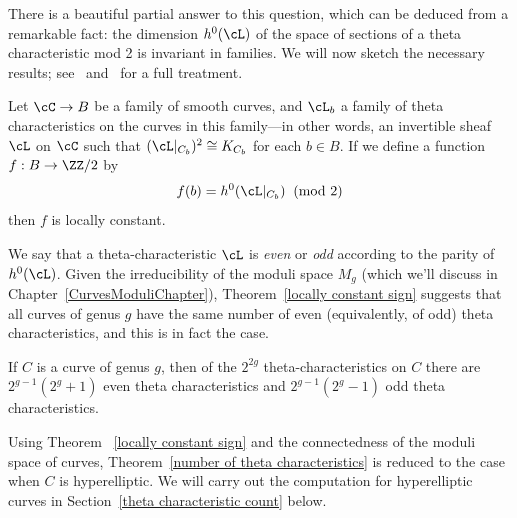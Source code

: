  There is a beautiful partial answer to this question, which can be deduced from a remarkable fact: the dimension $h^0(\cL)$ of the space of sections of a theta characteristic mod 2 is invariant in families.
We will now
sketch the necessary results; see~\cite{MumfordPaper} and~\cite{JHPaper} for a full treatment.

 \begin{theorem}\label{locally constant sign} Let $\cC \to B$ be a family of smooth curves, and $\cL_b$ a family of theta characteristics on the curves in this family---in other words, an invertible sheaf $\cL$ on $\cC$ such that $(\cL|_{C_b})^2 \cong K_{C_b}$ for each $b \in B$. If we define a function $f : B \to \ZZ/2$  by
 $$
 f(b) = h^0(\cL|_{C_b}) \;  \; (\text{mod } 2)
 $$
then $f$ is locally constant.
\end{theorem}

We say that a theta-characteristic $\cL$ is \emph{even} or \emph{odd} according to the parity of $h^0(\cL)$. Given the irreducibility of the moduli space $M_g$ (which we'll discuss in Chapter~\ref{CurvesModuliChapter}),  Theorem~\ref{locally constant sign} suggests that all curves of genus $g$ have the same number of even (equivalently, of odd) theta characteristics, and this is in fact the case. 

\begin{theorem}\label{number of theta characteristics}
If $C$ is a curve of genus $g$, then of the $2^{2g}$ theta-characteristics on $C$ there are $2^{g-1}(2^g + 1)$ even theta characteristics and $2^{g-1}(2^g-1)$ odd theta characteristics.
\end{theorem}

Using Theorem ~\ref{locally constant sign} and the connectedness of the moduli space of curves, 
Theorem~\ref{number of theta characteristics} is reduced to the case when $C$ is hyperelliptic. We will carry out the computation for hyperelliptic curves in Section~\ref{theta characteristic count} below.

